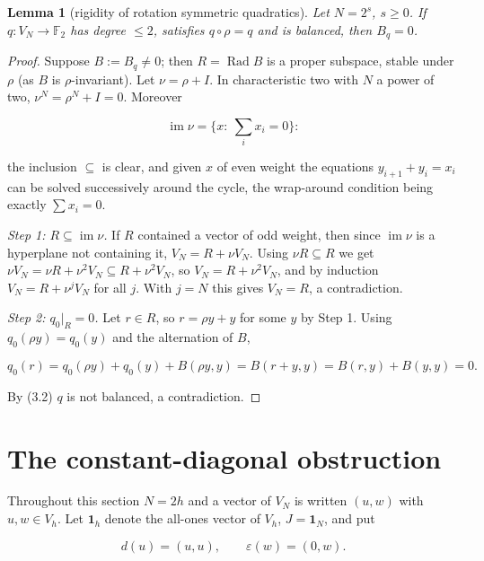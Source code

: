 \documentclass[11pt,reqno]{amsart}
\newtheorem{lemma}{Lemma}[section]
\begin{document}
\begin{lemma}[rigidity of rotation symmetric quadratics]
Let $N=2^s$, $s\ge0$. If $q:V_N\to\mathbb F_2$ has degree $\le2$, satisfies $q\circ\rho=q$ and is balanced, then $B_q=0$.

\end{lemma}
\begin{proof}
Suppose $B:=B_q\ne0$; then $R=\operatorname{Rad}B$ is a proper subspace, stable under $\rho$ (as $B$ is $\rho$-invariant). Let $\nu=\rho+I$. In characteristic two with $N$ a power of two, $\nu^N=\rho^N+I=0$. Moreover

\begin{equation*}\operatorname{im}\nu=\Big\{x:\ \textstyle\sum_ix_i=0\Big\}:\end{equation*}

the inclusion $\subseteq$ is clear, and given $x$ of even weight the equations $y_{i+1}+y_i=x_i$ can be solved successively around the cycle, the wrap-around condition being exactly $\sum x_i=0$.

\emph{Step 1: $R\subseteq\operatorname{im}\nu$.} If $R$ contained a vector of odd weight, then since $\operatorname{im}\nu$ is a hyperplane not containing it, $V_N=R+\nu V_N$. Using $\nu R\subseteq R$ we get $\nu V_N=\nu R+\nu^2V_N\subseteq R+\nu^2V_N$, so $V_N=R+\nu^2V_N$, and by induction $V_N=R+\nu^jV_N$ for all $j$. With $j=N$ this gives $V_N=R$, a contradiction.

\emph{Step 2: $q_0|_R=0$.} Let $r\in R$, so $r=\rho y+y$ for some $y$ by Step 1. Using $q_0(\rho y)=q_0(y)$ and the alternation of $B$,

\begin{equation*}q_0(r)=q_0(\rho y)+q_0(y)+B(\rho y,y)=B(r+y,y)=B(r,y)+B(y,y)=0.\end{equation*}

By (3.2) $q$ is not balanced, a contradiction.
\end{proof}


\section{The constant-diagonal obstruction}

Throughout this section $N=2h$ and a vector of $V_N$ is written $(u,w)$ with $u,w\in V_h$. Let $\mathbf 1_h$ denote the all-ones vector of $V_h$, $J=\mathbf 1_N$, and put

\begin{equation*}d(u)=(u,u),\qquad \varepsilon(w)=(0,w).\end{equation*}
\end{document}

